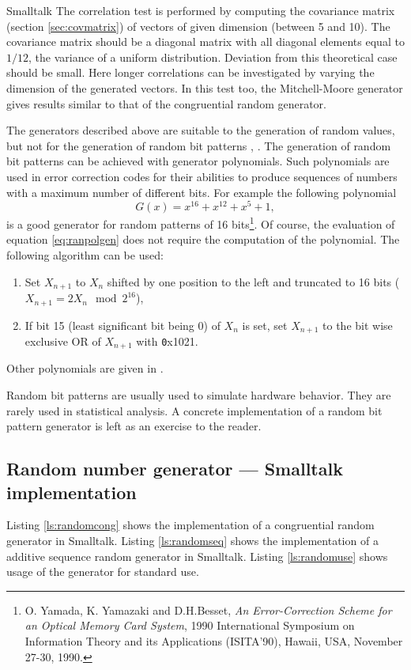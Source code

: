 \begin{displaycode}{Smalltalk}
The correlation test is performed by computing the covariance
matrix (\cf section \ref{sec:covmatrix}) of vectors of given
dimension (between 5 and 10). The covariance matrix should be a
diagonal matrix with all diagonal elements equal to $1/12$, the
variance of a uniform distribution. Deviation from this
theoretical case should be small. Here longer correlations can be
investigated by varying the dimension of the generated vectors. In
this test too, the Mitchell-Moore generator gives results similar
to that of the congruential random generator.

 The generators described above
are suitable to the generation of random values, but not for the
generation of random bit patterns \cite{Knuth2}, \cite{Press}. The
generation of random bit patterns can be achieved with generator
polynomials. Such polynomials are used in error correction codes
for their abilities to produce sequences of numbers with a maximum
number of different bits. For example the following polynomial
\begin{equation}
\label{eq:ranpolgen}
  G\left(x\right) = x^{16} + x^{12} +x^5 + 1,
\end{equation}
is a good generator for random patterns of 16 bits\footnote{\cf O.
Yamada, K. Yamazaki and D.H.Besset, {\em An Error-Correction
Scheme for an Optical Memory Card System}, 1990 International
Symposium on Information Theory and its Applications (ISITA'90),
Hawaii, USA, November 27-30, 1990.}. Of course, the evaluation of
equation \ref{eq:ranpolgen} does not require the computation of
the polynomial. The following algorithm can be used: {\parskip 0pt
\begin{enumerate}
  \item Set $X_{n+1}$ to $X_n$ shifted by one position to the left
  and truncated to 16 bits ($X_{n+1}=2X_n \mod 2^{16}$),
  \item If bit 15 (least significant bit being 0) of $X_n$ is set,
  set $X_{n+1}$ to the bit wise exclusive OR of $X_{n+1}$ with
  {\texttt 0x1021}.
\end{enumerate}}
\noindent Other polynomials are given in \cite{Press}.

Random bit patterns are usually used to simulate hardware
behavior. They are rarely used in statistical analysis. A concrete
implementation of a random bit pattern generator is left as an
exercise to the reader.

\subsection{Random number generator --- Smalltalk implementation}
 Listing \ref{ls:randomcong} shows
the implementation of a congruential random generator in
Smalltalk. Listing \ref{ls:randomseq} shows the implementation of
a additive sequence random generator in Smalltalk. Listing
\ref{ls:randomuse} shows usage of the generator for standard use.


\end{displaycode}
